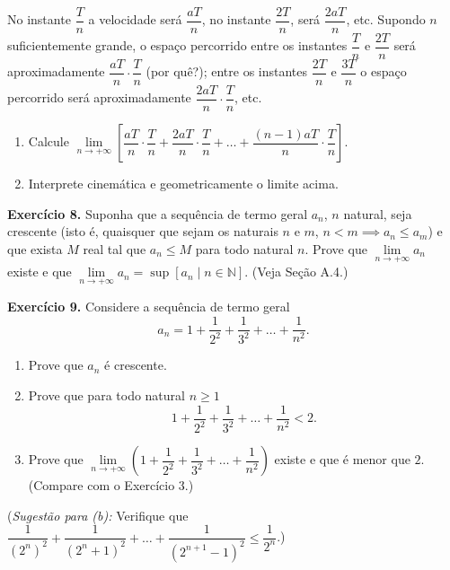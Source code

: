 \documentclass[12pt,a4paper]{article}
\begin{document}
\noindent No instante $\dfrac{T}{n}$ a velocidade será $\dfrac{aT}{n}$, no instante $\dfrac{2T}{n}$, será $\dfrac{2aT}{n}$, etc. Supondo $n$ suficientemente grande, o espaço percorrido entre os instantes $\dfrac{T}{n}$ e $\dfrac{2T}{n}$ será aproximadamente $\dfrac{aT}{n}\cdot\dfrac{T}{n}$ (por quê?); entre os instantes $\dfrac{2T}{n}$ e $\dfrac{3T}{n}$ o espaço percorrido será aproximadamente $\dfrac{2aT}{n}\cdot\dfrac{T}{n}$, etc.
\begin{enumerate}
    \renewcommand{\theenumi}{\alph{enumi}}
    \renewcommand{\labelenumi}{\theenumi)}
    \item Calcule $\lim\limits_{n \to +\infty} \left[\dfrac{aT}{n}\cdot\dfrac{T}{n} + \dfrac{2aT}{n}\cdot\dfrac{T}{n} + \dots + \dfrac{(n - 1)aT}{n}\cdot\dfrac{T}{n}\right]$.
    \item Interprete cinemática e geometricamente o limite acima.
\end{enumerate}

\vspace{0.5cm}
\noindent\textbf{Exercício 8.}
Suponha que a sequência de termo geral $a_n$, $n$ natural, seja crescente (isto é, quaisquer que sejam os naturais $n$ e $m$, $n < m \implies a_n \le a_m$) e que exista $M$ real tal que $a_n \le M$ para todo natural $n$. Prove que $\lim\limits_{n \to +\infty} a_n$ existe e que $\lim\limits_{n \to +\infty} a_n = \sup[a_n \mid n \in \mathbb{N}]$. (Veja Seção A.4.)

\vspace{0.5cm}
\noindent\textbf{Exercício 9.} Considere a sequência de termo geral
\[
a_n = 1 + \dfrac{1}{2^2} + \dfrac{1}{3^2} + \dots + \dfrac{1}{n^2}.
\]
\begin{enumerate}
    \renewcommand{\theenumi}{\alph{enumi}}
    \renewcommand{\labelenumi}{\theenumi)}
    \item Prove que $a_n$ é crescente.
    \item Prove que para todo natural $n \ge 1$
    \[
    1 + \dfrac{1}{2^2} + \dfrac{1}{3^2} + \dots + \dfrac{1}{n^2} < 2.
    \]
    \item Prove que $\lim\limits_{n \to +\infty} \left(1 + \dfrac{1}{2^2} + \dfrac{1}{3^2} + \dots + \dfrac{1}{n^2}\right)$ existe e que é menor que $2$. (Compare com o Exercício 3.)
\end{enumerate}
(\textit{Sugestão para (b):} Verifique que $\dfrac{1}{(2^n)^2} + \dfrac{1}{(2^n + 1)^2} + \dots + \dfrac{1}{(2^{n+1} - 1)^2} \le \dfrac{1}{2^n}$.)
\end{document}

